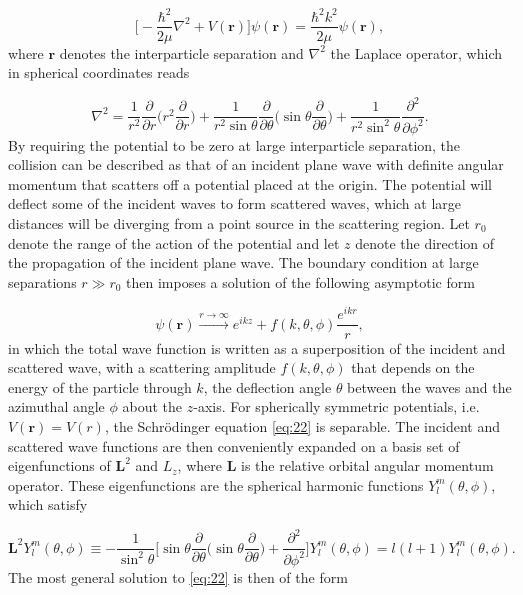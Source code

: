 \documentclass{article}
\numberwithin{equation}{section}
\numberwithin{figure}{section}
\begin{document}
\begin{equation} \label{eq:22}
\bigg[-\frac{\hbar^2}{2\mu}\nabla^2 + V(\mathbf{r})\bigg]\psi(\mathbf{r}) = \frac{\hbar^2 k^2}{2 \mu}\psi(\mathbf{r}),
\end{equation}
where $\mathbf{r}$ denotes the interparticle separation and $\nabla^2$ the Laplace operator, which in spherical coordinates reads

\begin{equation} \label{eq:23}
\nabla^2 = \frac{1}{r^2} \frac{\partial}{\partial r} \bigg(r^2 \frac{\partial}{\partial r}\bigg) + \frac{1}{r^2 \sin\theta} \frac{\partial}{\partial\theta} \bigg(\sin\theta \frac{\partial}{\partial\theta}\bigg) + \frac{1}{r^2 \sin^2\theta} \frac{\partial^2}{\partial\phi^2}.
\end{equation}
By requiring the potential to be zero at large interparticle separation, the collision can be described as that of an incident plane wave with definite angular momentum that scatters off a potential placed at the origin. The potential will deflect some of the incident waves to form scattered waves, which at large distances will be diverging from a point source in the scattering region. Let $r_0$ denote the range of the action of the potential and let $z$ denote the direction of the propagation of the incident plane wave. The boundary condition at large separations $r \gg r_0$ then imposes a solution of the following asymptotic form

\begin{equation}\label{eq:26}
\psi(\mathbf{r}) \xrightarrow{r \to \infty} e^{ikz} + f(k,\theta,\phi)\frac{e^{ikr}}{r},
\end{equation}
in which the total wave function is written as a superposition of the incident and scattered wave, with a scattering amplitude $f(k,\theta,\phi)$ that depends on the energy of the particle through $k$, the deflection angle $\theta$ between the waves and the azimuthal angle $\phi$ about the $z$-axis. For spherically symmetric potentials, i.e. $V(\mathbf{r}) = V(r)$, the Schr{\"o}dinger equation \eqref{eq:22} is separable. The incident and scattered wave functions are then conveniently expanded on a basis set of eigenfunctions of $\mathbf{L}^2$ and $L_z$, where $\mathbf{L}$ is the relative orbital angular momentum operator. These eigenfunctions are the spherical harmonic functions $Y_l^m(\theta,\phi)$, which satisfy 

\begin{equation}
\mathbf{L}^2 Y_l^m(\theta,\phi) \equiv -\frac{1}{ \sin^2\theta} \bigg[ \sin\theta \frac{\partial}{\partial\theta} \bigg(\sin\theta \frac{\partial}{\partial\theta}\bigg) +  \frac{\partial^2}{\partial\phi^2}\bigg] Y_l^m(\theta,\phi) = l(l+1)Y_l^m(\theta,\phi).
\end{equation}
The most general solution to \eqref{eq:22} is then of the form
\end{document}
